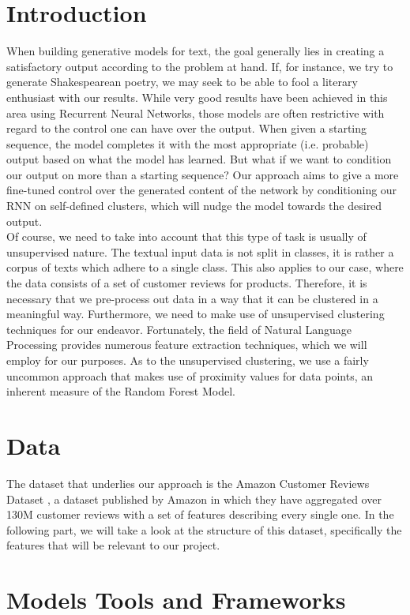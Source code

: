 \documentclass[]{report}
\begin{document}
\chapter{Introduction}
When building generative models for text, the goal generally lies in creating a satisfactory output according to the problem at hand. If, for instance, we try to generate Shakespearean poetry, we may seek to be able to fool a literary enthusiast with our results. While very good results have been achieved in this area using Recurrent Neural Networks\cite{karpathy}, those models are often restrictive with regard to the control one can have over the output. When given a starting sequence, the model completes it with the most appropriate (i.e. probable) output based on what the model has learned. But what if we want to condition our output on more than a starting sequence? Our approach aims to give a more fine-tuned control over the generated content of the network by conditioning our RNN on self-defined clusters, which will nudge the model towards the desired output. \\
Of course, we need to take into account that this type of task is usually of unsupervised nature. The textual input data is not split in classes, it is rather a corpus of texts which adhere to a single class. This also applies to our case, where the data consists of a set of customer reviews for products. Therefore, it is necessary that we pre-process out data in a way that it can be clustered in a meaningful way. Furthermore, we need to make use of unsupervised clustering techniques for our endeavor. Fortunately, the field of Natural Language Processing provides numerous feature extraction techniques, which we will employ for our purposes. As to the unsupervised clustering, we use a fairly uncommon approach that makes use of proximity values for data points, an inherent measure of the Random Forest Model. 


\chapter{Data}
The dataset that underlies our approach is the Amazon Customer Reviews Dataset \cite{amazondataset}, a dataset published by Amazon in which they have aggregated over 130M customer reviews with a set of features describing every single one. In the following part, we will take a look at the structure of this dataset, specifically the features that will be relevant to our project.

\chapter{Models Tools and Frameworks}
\end{document}
